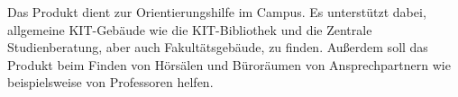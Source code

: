 Das Produkt dient zur Orientierungshilfe im \Gls{Campus}.
Es unterstützt dabei, allgemeine \Gls{KIT}-Gebäude wie die \Gls{KIT}-Bibliothek und die Zentrale Studienberatung, aber auch Fakultätsgebäude, zu finden. 
Außerdem soll das Produkt beim Finden von Hörsälen und Büroräumen von Ansprechpartnern wie beispielsweise von Professoren helfen.
